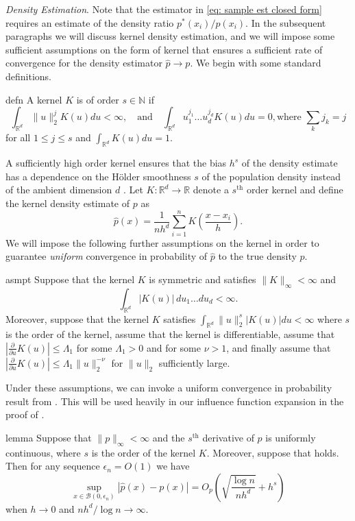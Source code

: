 \documentclass[11pt]{article}
\begin{document}
\emph{Density Estimation}. Note that the estimator in \cref{eq: sample est closed form} requires an estimate of the density ratio $p^*(x_i)/p(x_i)$. In the subsequent paragraphs we will discuss kernel density estimation, and we will impose some sufficient assumptions on the form of kernel that ensures a sufficient rate of convergence for the density estimator $\hat{p}\to p$. We begin with some standard definitions.
\begin{restatable}{defn}{}
    A kernel $K$ is of order $s \in \mathbb N$ if 
    \[\int_{\mathbb{R}^d}\|u\|_2^jK(u)du < \infty, \quad \text{and}\quad \int_{\mathbb{R}^d}u_1^{j_1}\dots u_d^{j_d}K(u) du = 0, \text{where } \sum_kj_k = j\]
    for all $1 \leq j \leq s$ and 
    $\int_{\mathbb{R}^d}K(u)du = 1.$
\end{restatable}
A sufficiently high order kernel ensures that the bias $h^s$ of the density estimate has a dependence on the H\"older smoothness $s$ of the population density instead of the ambient dimension $d$ \citep[Proposition 1.2]{tsybakov2009introduction}. Let $K:\mathbb{R}^d \rightarrow \mathbb{R}$ denote a $s^{\text{th}}$ order kernel and define the kernel density estimate of $p$ as
\begin{equation}
    \hat{p}(x) = \frac{1}{nh^d}\sum_{i = 1}^nK\left(\frac{x -x_i}{h}\right). \label{eq: kde}
\end{equation}
We will impose the following further assumptions on the kernel in order to guarantee \emph{uniform} convergence in probability of $\hat{p}$ to the true density $p$.


\begin{restatable}{asmpt}{} \label{further kernel assumptions}
    Suppose that the kernel $K$ is symmetric and satisfies $\|K\|_{\infty} < \infty$ and 
    \[\int_{\mathbb{R}^d}|K(u)|\,du_1\dots du_d < \infty.\]
    Moreover, suppose that the kernel $K$ satisfies $\int_{\mathbb{R}^d}\|u\|_2^s|K(u)|du  < \infty$ where $s$ is the order of the kernel, assume that the kernel is differentiable, assume that $\left|\frac{\partial}{\partial u}K(u)\right| \leq \Lambda_1$ for some $\Lambda_1 > 0$ and for some $\nu > 1$, and finally assume that $\left|\frac{\partial}{\partial u}K(u)\right| \leq \Lambda_1\|u\|_2^{-\nu}$ for $\|u\|_2$ sufficiently large.
\end{restatable}
Under these assumptions, we can invoke a uniform convergence in probability result from \citet{hansen2008uniform}. This will be used heavily in our influence function expansion in the proof of .
\begin{restatable}{lemma}{} \label{lemma: uniform convergence of kde}
    Suppose that $\|p\|_{\infty}< \infty$ and the $s^{\text{th}}$ derivative of $p$ is uniformly continuous, where $s$ is the order of the kernel $K$. Moreover, suppose that  holds. Then for any sequence $\epsilon_n  = O(1)$ we have
    \[\sup_{x \in \mathcal{B}(0, \epsilon_n)}\left|\hat{p}(x) - p(x)\right| = O_p\left(\sqrt{\frac{\log n}{nh^d}} +h^s \right)\]
    when $h \to 0$ and $nh^d/\log n \to \infty$.
\end{restatable}
\end{document}
